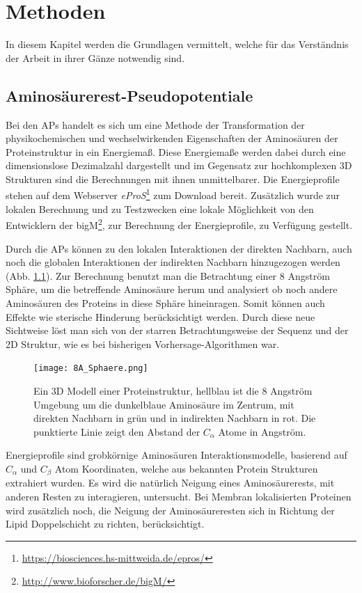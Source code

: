 \chapter{Methoden}

In diesem Kapitel werden die Grundlagen vermittelt, welche für das Verständnis der Arbeit in ihrer Gänze notwendig sind.

\section{Aminosäurerest-Pseudopotentiale}

Bei den \acf{APs} handelt es sich um eine Methode der Transformation der physikochemischen und wechselwirkenden Eigenschaften der Aminosäuren der Proteinstruktur in ein Energiemaß. Diese Energiemaße werden dabei durch eine dimensionslose Dezimalzahl dargestellt und im Gegensatz zur hochkomplexen 3D Strukturen sind die Berechnungen mit ihnen unmittelbarer. Die Energieprofile stehen auf dem Webserver \emph{eProS}\footnote{\url{https://biosciences.hs-mittweida.de/epros/}} zum Download bereit. Zusätzlich wurde zur lokalen Berechnung und zu Testzwecken eine lokale Möglichkeit von den Entwicklern der \ac{bigM}\footnote{\url{http://www.bioforscher.de/bigM/}}, zur Berechnung der Energieprofile, zu Verfügung gestellt.

Durch die \ac{APs} können zu den lokalen Interaktionen der direkten Nachbarn, auch noch die globalen Interaktionen der indirekten Nachbarn hinzugezogen werden (Abb. \ref{fig:8A_Sphaere}). Zur Berechnung benutzt man die Betrachtung einer 8 Angström Sphäre, um die betreffende Aminosäure herum und analysiert ob noch andere Aminosäuren des Proteins in diese Sphäre hineinragen. Somit können auch Effekte wie sterische Hinderung berücksichtigt werden. Durch diese neue Sichtweise löst man sich von der starren Betrachtungsweise der Sequenz und der 2D Struktur, wie es bei bisherigen Vorhersage-Algorithmen war.
%
\begin{figure}
\centering
\texttt{[image: 8A\_Sphaere.png]}
\caption{Ein 3D Modell einer Proteinstruktur, hellblau ist die 8 Angström Umgebung um die dunkelblaue Aminosäure im Zentrum, mit direkten Nachbarn in grün und in indirekten Nachbarn in rot. Die punktierte Linie zeigt den Abstand der $C_{\alpha}$ Atome in Angström.}%
\label{fig:8A_Sphaere}
\end{figure}

Energieprofile sind grobkörnige Aminosäuren Interaktionsmodelle, basierend auf $C_{\alpha}$ und $C_{\beta}$ Atom Koordinaten, welche aus bekannten Protein Strukturen extrahiert wurden. Es wird die natürlich Neigung eines Aminosäurerests, mit anderen Resten zu interagieren, untersucht. Bei Membran lokalisierten Proteinen wird zusätzlich noch, die Neigung der Aminosäureresten sich in Richtung der Lipid Doppelschicht zu richten, berücksichtigt. 

